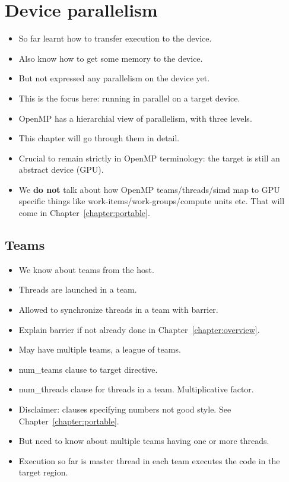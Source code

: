 
\chapter{Device parallelism}
\label{chapter:parallelism}

\begin{itemize}
  \item So far learnt how to transfer execution to the device.
  \item Also know how to get some memory to the device.
  \item But not expressed any parallelism on the device yet.
  \item This is the focus here: running in parallel on a target device.
  \item OpenMP has a hierarchial view of parallelism, with three levels.
  \item This chapter will go through them in detail.
  \item Crucial to remain strictly in OpenMP terminology: the target is still an abstract device (GPU).
  \item We {\bf do not} talk about how OpenMP teams/threads/simd map to GPU specific things like work-items/work-groups/compute units etc. That will come in Chapter~\ref{chapter:portable}.
\end{itemize}

\section{Teams}
\begin{itemize}
  \item We know about teams from the host.
  \item Threads are launched in a team.
  \item Allowed to synchronize threads in a team with barrier.
  \item Explain barrier if not already done in Chapter~\ref{chapter:overview}.
  \item May have multiple teams, a league of teams.
  \item num\_teams clause to target directive.
  \item num\_threads clause for threads in a team. Multiplicative factor.
  \item Disclaimer: clauses specifying numbers not good style. See Chapter~\ref{chapter:portable}.
  \item But need to know about multiple teams having one or more threads.
  \item Execution so far is master thread in each team executes the code in the target region.
\end{itemize}

